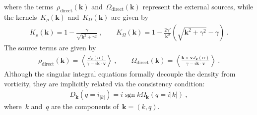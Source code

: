 \documentclass[preprint,aps,eqsecnum]{revtex4-1}
\newcommand{\sgn}{\mathop{\mathrm{sgn}}\nolimits}
\begin{document}
where the terms~$ \rho_\mathrm{direct}({\bm k})$
and~$\Omega_\mathrm{direct}({\bm k})$ represent the external
sources, while the kernels~$K_\rho({\bm k})$ and~$K_\Omega({\bm k})$
are given by
\begin{align}
  K_\rho({\bm k}) = 1 - \frac{\gamma}{\sqrt{{\bm k}^2 + \gamma^2}}\ ,
  \qquad
  K_\Omega({\bm k}) = 1 - \frac{2\gamma'}{{\bm k}^2}
  \left(\sqrt{{\bm k}^2 + \gamma^2} - \gamma\right)\ . 
\end{align}
The source terms are given by
\begin{align}
  \rho_\mathrm{direct}({\bm k})
  = \left\langle \frac{J_{\bm k}(\alpha)}{\gamma -i {\bm k}\cdot{\bm v}} \right\rangle
  \ ,
  \qquad
  \Omega_\mathrm{direct}({\bm k}) =
  \left\langle \frac{{\bm k}\times{\bm v} J_{\bm k}(\alpha)}{
       \gamma -i {\bm k}\cdot{\bm v}} \right\rangle \ . 
\end{align}
Although the singular integral equations formally decouple the density
from vorticity, they are implicitly related via the
consistency condition:
\begin{align}
  D_{\bm k}(q = i_|k|) = i \sgn k \Omega_{\bm k}(q = i |k|)\ , 
\end{align}
where~$k$ and~$q$ are the components of~${\bm k} = (k, q)$. 
\end{document}
